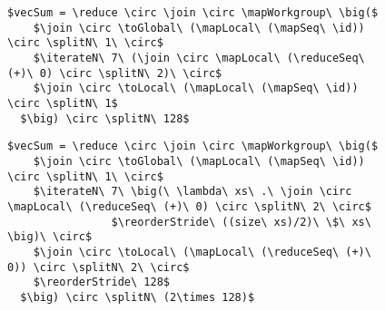 \begin{figure*}[t]
\captionsetup[subfigure]{justification=justified,singlelinecheck=false}

\begin{subfigure}[b]{\linewidth}
\vspace{.4em}
\begin{minipage}{.05\linewidth}
\caption{}
\label{fig:reduce:expr:1}
\end{minipage}
\hfill
\begin{minipage}{.9\linewidth}
\begin{lstlisting}[mathescape, basicstyle=\small\rmfamily]
$vecSum = \reduce \circ \join \circ \mapWorkgroup\ \big($
    $\join \circ \toGlobal\ (\mapLocal\ (\mapSeq\ \id)) \circ \splitN\ 1\ \circ$
    $\iterateN\ 7\ (\join \circ \mapLocal\ (\reduceSeq\ (+)\ 0) \circ \splitN\ 2)\ \circ$
    $\join \circ \toLocal\ (\mapLocal\ (\mapSeq\ \id)) \circ \splitN\ 1$
  $\big) \circ \splitN\ 128$
\end{lstlisting}
\end{minipage}
\end{subfigure}

\begin{subfigure}[b]{\linewidth}
\vspace{0em}
\begin{minipage}{.05\linewidth}
\caption{}
\label{fig:reduce:expr:2}
\end{minipage}
\hfill
\begin{minipage}{.9\linewidth}
\begin{lstlisting}[mathescape, basicstyle=\small\rmfamily]
$vecSum = \reduce \circ \join \circ \mapWorkgroup\ \big($
    $\join \circ \toGlobal\ (\mapLocal\ (\mapSeq\ \id)) \circ \splitN\ 1\ \circ$
    $\iterateN\ 7\ \big(\ \lambda\ xs\ .\ \join \circ \mapLocal\ (\reduceSeq\ (+)\ 0) \circ \splitN\ 2\ \circ$
                $\reorderStride\ ((size\ xs)/2)\ \$\ xs\ \big)\ \circ$
    $\join \circ \toLocal\ (\mapLocal\ (\reduceSeq\ (+)\ 0)) \circ \splitN\ 2\ \circ$
    $\reorderStride\ 128$
  $\big) \circ \splitN\ (2\times 128)$
\end{lstlisting}
\end{minipage}
\end{subfigure}


\end{figure*}

